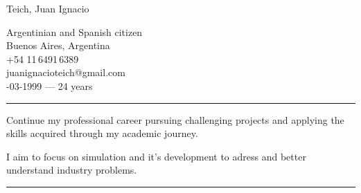 \documentclass[a4paper,10pt]{article}
\newlength{\cvcolumngapwidth}
\newlength{\cvleftcolumnwidth}
\newlength{\cvrightcolumnwidth}
\newcommand{\cvnamestyle}[1]{{\Large\cvnamefont\textcolor{cvnamecolor}{#1}}}
\newcommand{\cvsectionstyle}[1]{{\normalsize\cvsectionfont\textcolor{cvsectioncolor}{#1}}}
\newcommand{\cvheadingstyle}[1]{{\normalsize\cvheadingfont\textcolor{cvheadingcolor}{#1}}}
\newlength{\cvafteritemskipamount}
\newlength{\cvaftersectionskipamount}
\newlength{\cvbetweensectionandheadingextraskipamount}
\newlength{\cvafternameskipamount}
\newlength{\cvafterpersonalinfolineskipamount}
\newlength{\cvparskip}
\newcommand{\cvpersonalinfo}[2]{
    \begin{minipage}[t]{\cvleftcolumnwidth}
        \vspace{0mm} %
        \raggedleft #1
    \end{minipage}%
    \hspace{\cvcolumngapwidth}%
    \begin{minipage}[t]{\cvrightcolumnwidth}
        \vspace{0mm} %
        #2
    \end{minipage}

    \vspace{\cvafteritemskipamount}
}
\newcommand{\cvname}[1]{
    \cvnamestyle{#1}

    \vspace{\cvafternameskipamount}
}
\newcommand{\cvpersonalinfolinewithicon}[3]{
    \raisebox{.5\fontcharht\font`E-.5\height}{\texttt{[image: \#2]}}
    #3

    \vspace{\cvafterpersonalinfolineskipamount}
}
\newcommand{\cvsection}[1]{
    \begin{minipage}[t]{\cvleftcolumnwidth}
        \raggedleft\cvsectionstyle{#1}
    \end{minipage}%
    \hspace{\cvcolumngapwidth}%
    \begin{minipage}[t]{\cvrightcolumnwidth}
        \textcolor{cvrulecolor}{\rule{\cvrightcolumnwidth}{0.3mm}}
    \end{minipage}

    \vspace{\cvaftersectionskipamount}
}
\newcommand{\cvitem}[2]{
    \begin{minipage}[t]{\cvleftcolumnwidth}
        \raggedleft #1
    \end{minipage}%
    \hspace{\cvcolumngapwidth}%
    \begin{minipage}[t]{\cvrightcolumnwidth}
        \setlength{\parskip}{\cvparskip} #2
    \end{minipage}

    \vspace{\cvafteritemskipamount}
}
\begin{document}

  \flushright
    \cvname{Teich, Juan Ignacio}

    \faFlag \quad Argentinian and Spanish citizen \\


    \faMapPin \quad Buenos Aires, Argentina \\

    \faPhone \quad +54 11\,6491\,6389 \\
  \faInbox \quad juanignacioteich@gmail.com \\


    \faCalendar  {}-03-1999  ---   24 years

\cvsection{PROFESSIONAL OBJECTIVES}

\vspace{\cvbetweensectionandheadingextraskipamount}
\cvitem{\cvheadingstyle{}}{
    Continue my professional career pursuing challenging projects and applying the skills acquired through my academic journey.

    I aim to focus on simulation and it's development to adress and better understand industry problems.
}



\cvsection{EDUCATION}
\end{document}

